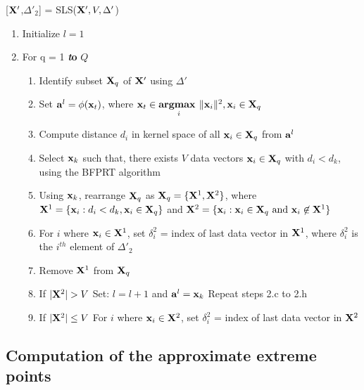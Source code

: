 \documentclass[twoside]{article}
\begin{document}
\begin{algorithm}[h]
 \renewcommand{\thealgorithm}{}
\caption{[${\bf X}' $,$\Delta' _2$] = SLS(${\bf X}' ,V,\Delta' $)}
\begin{enumerate} \addtolength{\itemsep}{-.35\baselineskip}
 \item Initialize $l = 1$
 \item For q = 1 {\bf{\emph to}} $Q$
 \begin{enumerate}
 \item Identify subset ${\bf X}_q$ of ${\bf X}' $ using $\Delta' $
 \item Set ${\bf a}^l = \phi({\bf x}_t)$, where ${\bf x}_t \in \underset{i}{\textbf{argmax }}\|{\bf x}_i \|^2, {\bf x}_i \in {\bf X}_q$
 \item Compute distance $d_i$ in kernel space of all ${\bf x}_i \in {\bf X}_q$ from ${\bf a}^l$
 \item Select ${\bf x}_k$ such that, there exists $V$ data vectors ${\bf x}_i \in {\bf X}_q$ with $d_i < d_k$, using the BFPRT algorithm
 \item Using ${\bf x}_k$, rearrange ${\bf X}_q$ as ${\bf X}_q = \{{\bf X}^1,{\bf X}^2\}$, where ${\bf X}^1 = \{{\bf x}_i: d_i < d_k, {\bf x}_i \in {\bf X}_q\}$ and ${\bf X}^2 = \{{\bf x}_i: {\bf x}_i \in {\bf X}_q \text{ and } {\bf x}_i \not\in {\bf X}^1\}$
 \item For $i$ where ${\bf x}_i \in {\bf X}^1$, set $\delta_i ^2$ = index of last data vector in ${\bf X}^1$, where $\delta_i ^2$ is the $i^{th}$ element of $\Delta' _2$
 \item Remove  ${\bf X}^1$ from ${\bf X}_q$
 \item If $|{\bf X}^2| > V$
 \subitem Set: $l = l + 1$ and ${\bf a}^l = {\bf x}_k$
 \subitem Repeat steps 2.c to 2.h
 \item If $|{\bf X}^2| \le V$
\subitem For $i$ where ${\bf x}_i \in {\bf X}^2$, set $\delta_i ^2$ = index of last data vector in ${\bf X}^2$
 \end{enumerate}
\end{enumerate}
\end{algorithm}

\subsection{Computation of the approximate extreme points}
\end{document}
